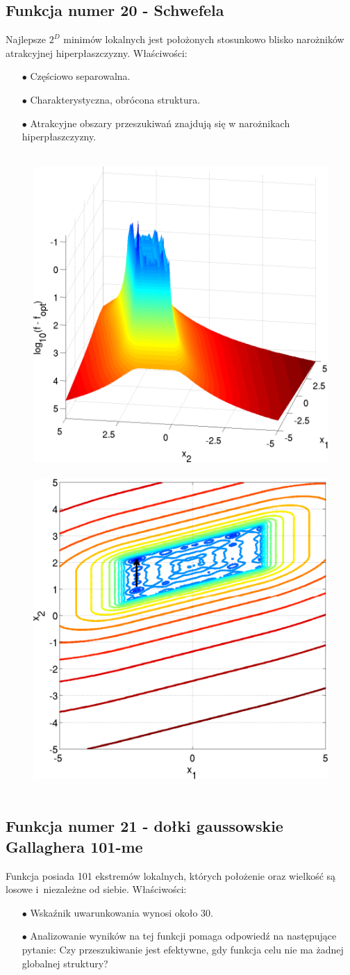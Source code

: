 \documentclass[a4paper,onecolumn,oneside,11pt,wide,floatssmall]{mwrep}
\theoremstyle{definition}
\theoremstyle{plain}%
\theoremstyle{remark}
\begin{document}
\subsection{Funkcja numer 20 - Schwefela}

Najlepsze $2^D$ minimów lokalnych jest położonych stosunkowo blisko narożników atrakcyjnej hiperpłaszczyzny. Właściwości:
\begin{itemize}
 \item[$\bullet$] Częściowo separowalna.
 \item[$\bullet$] Charakterystyczna, obrócona struktura.
 \item[$\bullet$] Atrakcyjne obszary przeszukiwań znajdują się w narożnikach hiperpłaszczyzny.
\end{itemize} 

\begin{figure}[H]
\centering
\mbox{
\includegraphics[width=.45\textwidth]{img/20.png} \quad
\includegraphics[width=.45\textwidth]{img/20a.png} 
}
\end{figure}

\subsection{Funkcja numer 21 - dołki gaussowskie Gallaghera 101-me}

Funkcja posiada 101 ekstremów lokalnych, których położenie oraz wielkość są losowe i~niezależne od siebie.
Właściwości:
\begin{itemize}
 \item[$\bullet$] Wskaźnik uwarunkowania wynosi około 30.
 \item[$\bullet$] Analizowanie wyników na tej funkcji pomaga odpowiedź na następujące pytanie: Czy przeszukiwanie jest efektywne, gdy funkcja celu
nie ma żadnej globalnej struktury?
\end{itemize} 
\end{document}
